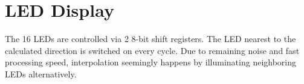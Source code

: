 \section{LED Display}
\label{sec::display}

The 16 LEDs are controlled via 2 8-bit shift registers.
The LED nearest to the calculated direction is switched on every cycle.
Due to remaining noise and fast processing speed, interpolation seemingly happens by illuminating neighboring LEDs alternatively.